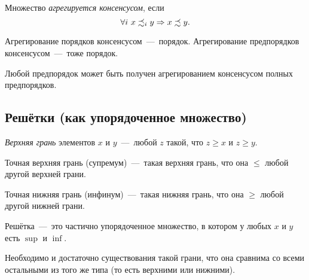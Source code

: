 \begin{definition}
	Множество \textit{агрегируется консенсусом}, если
	$$
		\forall i\ x \precsim_i y \Rightarrow x \precsim y.
	$$
\end{definition}

\begin{theorem}
	Агрегирование порядков консенсусом~---~порядок. 
	Агрегирование предпорядков консенсусом~---~тоже порядок.
\end{theorem}

\begin{theorem}
	Любой предпорядок может быть получен агрегированием консенсусом полных предпорядков.
\end{theorem}

\subsection{Решётки (как упорядоченное множество)}

\begin{definition}
	\textit{Верхняя грань} элементов $x$ и $y$~---~любой $z$ такой, что $z \ge x$ и $z \ge y$.
\end{definition}

\begin{definition}
	Точная верхняя грань (супремум)~---~такая верхняя грань, что она $\le$ любой другой верхней грани.
\end{definition}

\begin{definition}
	Точная нижняя грань (инфинум)~---~такая нижняя грань, что она $\ge$ любой другой нижней грани.
\end{definition}

\begin{definition}
	Решётка~---~это частично упорядоченное множество, в котором у любых $x$ и $y$ есть $\sup$ и $\inf$.
\end{definition}

\begin{note}
	Необходимо и достаточно существования такой грани, что она сравнима со всеми остальными из того же типа (то есть верхними или нижними).
\end{note}